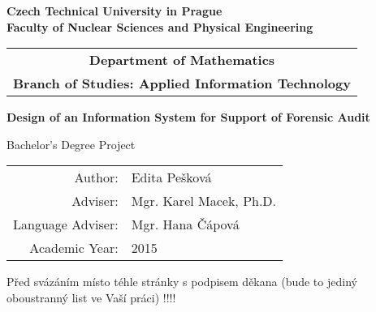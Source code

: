 \documentclass[a4paper,12pt]{report}
\newcommand{\cvut}{Czech Technical University in Prague}
\newcommand{\fjfi}{Faculty of Nuclear Sciences and Physical Engineering}
\newcommand{\kse}{Department of Mathematics}
\newcommand{\obor}{Applied Information Technology}
\newcommand{\zamereni}{}
\newcommand{\nazevcz}{Návrh informačního systému pro podporu forenzního auditu}        %
\newcommand{\nazeven}{Design of an Information System for Support of Forensic Audit}     %
\newcommand{\autor}{Edita Pešková}           %
\newcommand{\rok}{2015}                %
\newcommand{\vedouci}{Mgr. Karel Macek, Ph.D.}         %
\begin{document}
\thispagestyle{empty}

\begin{center}
    {\Large \bf \cvut\\[2mm] \fjfi }
    \vspace{10mm}

    \begin{tabular}{c}
    {\bf \kse}\\
    {\bf Branch of Studies: \obor}\\
    \end{tabular}

   \vspace{10mm} \epsfysize=25mm  \vspace{15mm}
   \vspace{50mm}

   {\Huge \bf \nazeven\par}

   \vspace{15mm}
   {\Large Bachelor's Degree Project}

   \vfill
   {\large
    \begin{tabular}{rl}
    Author: & \autor\\
    Adviser: & \vedouci\\
    Language Adviser: & Mgr. Hana Čápová\\
    Academic Year: & \rok
    \end{tabular}
   }
\end{center}



\newpage  %
\thispagestyle{empty} Před svázáním místo téhle stránky  s podpisem
děkana (bude to jediný oboustranný list ve Vaší práci) !!!!



\newpage %
\thispagestyle{empty}  %
\end{document}
